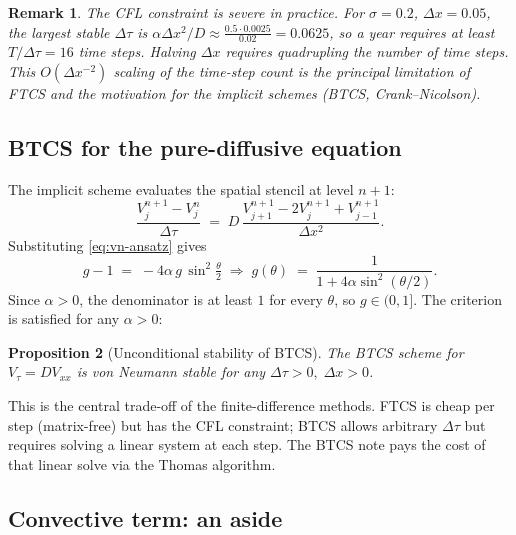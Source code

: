 \documentclass[11pt,a4paper]{article}
\newtheorem{proposition}{Proposition}[section]
\newtheorem{remark}[proposition]{Remark}
\begin{document}
\begin{remark}
The CFL constraint is severe in practice. For $\sigma = 0.2$,
$\Delta x = 0.05$, the largest stable $\Delta\tau$ is
$\alpha\Delta x^2 / D \approx \frac{0.5 \cdot 0.0025}{0.02} = 0.0625$,
so a year requires at least $T/\Delta\tau = 16$ time steps. Halving
$\Delta x$ requires \emph{quadrupling} the number of time steps. This
$O(\Delta x^{-2})$ scaling of the time-step count is the principal
limitation of FTCS and the motivation for the implicit schemes
(BTCS, Crank--Nicolson).
\end{remark}

\subsection{BTCS for the pure-diffusive equation}

The implicit scheme evaluates the spatial stencil at level $n+1$:
\[
\frac{V_j^{n+1} - V_j^n}{\Delta \tau}
\;=\; D\,\frac{V_{j+1}^{n+1} - 2 V_j^{n+1} + V_{j-1}^{n+1}}{\Delta x^2}.
\]
Substituting \eqref{eq:vn-ansatz} gives
\[
g - 1 \;=\; -4\alpha\,g\,\sin^2\!\tfrac{\theta}{2}
\;\Longrightarrow\;
g(\theta) \;=\; \frac{1}{1 + 4\alpha\sin^2(\theta/2)}.
\]
Since $\alpha > 0$, the denominator is at least $1$ for every
$\theta$, so $g \in (0, 1]$. The criterion is satisfied for any
$\alpha > 0$:
\begin{proposition}[Unconditional stability of BTCS]
\label{prop:btcs}
The BTCS scheme for $V_\tau = D V_{xx}$ is von Neumann stable for any
$\Delta\tau > 0,\; \Delta x > 0$.
\end{proposition}

This is the central trade-off of the finite-difference methods. FTCS is cheap per step
(matrix-free) but has the CFL constraint; BTCS allows arbitrary
$\Delta\tau$ but requires solving a linear system at each step.
The BTCS note pays the cost of that linear solve via the Thomas
algorithm.

\subsection{Convective term: an aside}
\end{document}
